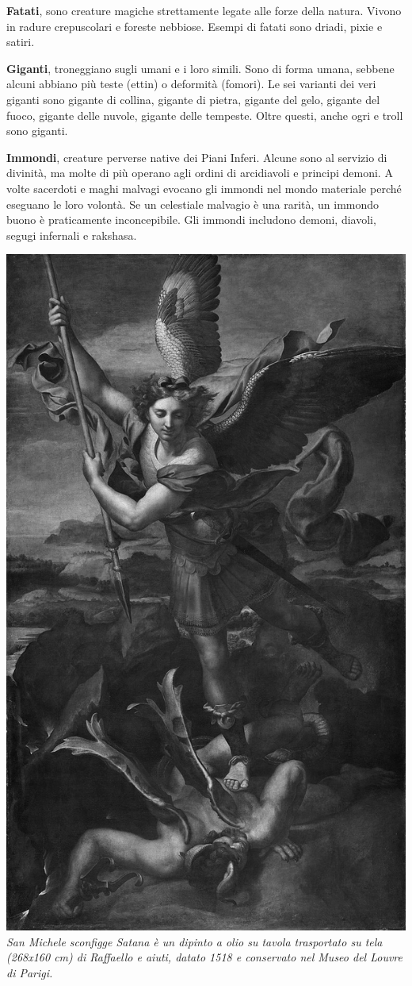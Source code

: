 \begin{multicols}{2}
\medskip\textbf{Fatati}, sono creature magiche strettamente legate alle forze della natura. Vivono in radure crepuscolari e foreste nebbiose. Esempi di fatati sono driadi, pixie e satiri.

\medskip\textbf{Giganti}, troneggiano sugli umani e i loro simili. Sono di forma umana, sebbene alcuni abbiano più teste (ettin) o deformità (fomori). Le sei varianti dei veri giganti sono gigante di collina, gigante di pietra, gigante del gelo, gigante del fuoco, gigante delle nuvole, gigante delle tempeste. Oltre questi, anche ogri e troll sono giganti. 

\medskip\textbf{Immondi}, creature perverse native dei Piani Inferi. Alcune sono al servizio di  divinità, ma molte di più operano agli ordini di arcidiavoli e principi demoni. A volte sacerdoti e maghi malvagi evocano gli immondi nel mondo materiale perché eseguano le loro volontà. Se un celestiale malvagio è una rarità, un immondo buono è praticamente inconcepibile. Gli immondi includono demoni, diavoli, segugi infernali e rakshasa. 

\begin{center}
	\includegraphics[width=0.9\linewidth]{immagini/sanmichelesatana.png}\\
	\textit{San Michele sconfigge Satana è un dipinto a olio su tavola trasportato su tela (268x160 cm) di Raffaello e aiuti, datato 1518 e conservato nel Museo del Louvre di Parigi.}
\end{center}


\end{multicols}
